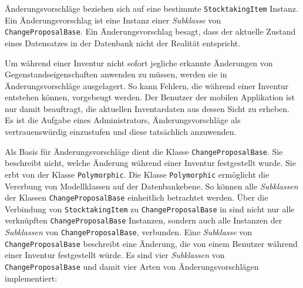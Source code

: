 Änderungsvorschläge beziehen sich auf eine bestimmte
\texttt{StocktakingItem} Instanz. Ein Änderungsvorschlag ist eine
Instanz einer
\emph{Subklasse}
von \texttt{ChangeProposalBase}. Ein Änderungsvorschlag besagt, dass der
aktuelle Zustand eines Datensatzes in der Datenbank nicht der Realität
entspricht.

Um während einer Inventur nicht sofort jegliche erkannte Änderungen von
Gegenstandseigenschaften anwenden zu müssen, werden sie in
Änderungsvorschläge ausgelagert. So kann Fehlern, die während einer
Inventur entstehen können, vorgebeugt werden. Der Benutzer der mobilen
Applikation ist nur damit beauftragt, die aktuellen Inventardaten aus
dessen Sicht zu erheben. Es ist die Aufgabe eines Administrators,
Änderungsvorschläge als vertrauenswürdig einzustufen und diese
tatsächlich anzuwenden.

Als Basis für Änderungsvorschläge dient die Klasse
\texttt{ChangeProposalBase}. Sie beschreibt nicht, welche Änderung
während einer Inventur festgestellt wurde. Sie erbt von der Klasse
\texttt{Polymorphic}. Die Klasse \texttt{Polymorphic} ermöglicht die
Vererbung von Modellklassen auf der Datenbankebene. So können alle
\emph{Subklassen}
der Klassen \texttt{ChangeProposalBase} einheitlich betrachtet werden.
Über die Verbindung von \texttt{StocktakingItem} zu
\texttt{ChangeProposalBase} in 
sind nicht nur alle verknüpften \texttt{ChangeProposalBase} Instanzen,
sondern auch alle Instanzen der
\emph{Subklassen}
von \texttt{ChangeProposalBase}, verbunden. Eine
\emph{Subklasse}
von \texttt{ChangeProposalBase} beschreibt eine Änderung, die von einem
Benutzer während einer Inventur festgestellt würde. Es sind vier
\emph{Subklassen}
von \texttt{ChangeProposalBase} und damit vier Arten von
Änderungsvorschlägen implementiert:

